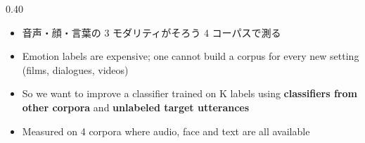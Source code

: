 \begin{frame}{}
\begin{columns}[T]
\begin{column}{0.40\textwidth}
{\begin{itemize}
\item 音声・顔・言葉の 3 モダリティがそろう 4 コーパスで測る
\end{itemize}
}{%
\begin{itemize}
\item Emotion labels are expensive; one cannot build a corpus for every new setting (films, dialogues, videos)
\item So we want to improve a classifier trained on K labels using \textbf{classifiers from other corpora} and \textbf{unlabeled target utterances}
\item Measured on 4 corpora where audio, face and text are all available
\end{itemize}
}
\end{column}
\end{columns}
\end{frame}

